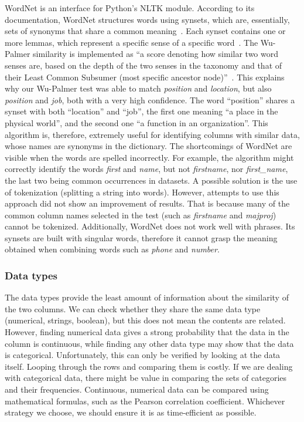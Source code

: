 \bigbreak

WordNet is an interface for Python's NLTK module.
According to its documentation, WordNet structures words using synsets, which are, essentially, sets of synonyms that
share a common meaning~\cite{wordnet}.
Each synset contains one or more lemmas, which represent a specific sense of a specific word~\cite{wordnet}.
The Wu-Palmer similarity is implemented as ``a score denoting how similar two word senses are, based on the depth of the
two senses in the taxonomy and that of their Least Common Subsumer (most specific ancestor node)''~\cite{wordnet}.
This explains why our Wu-Palmer test was able to match \textit{position} and \textit{location}, but also \textit{position}
and \textit{job}, both with a very high confidence.
The word ``position'' shares a synset with both ``location'' and ``job'', the first one meaning ``a place in the physical world'',
and the second one ``a function in an organization''.
This algorithm is, therefore, extremely useful for identifying columns with similar data, whose names are synonyms in the
dictionary.
The shortcomings of WordNet are visible when the words are spelled incorrectly.
For example, the algorithm might correctly identify the words \textit{first} and \textit{name}, but not \textit{firstname},
nor \textit{first\_name}, the last two being common occurrences in datasets.
A possible solution is the use of tokenization (splitting a string into words).
However, attempts to use this approach did not show an improvement of results.
That is because many of the common column names selected in the test (such as \textit{firstname} and \textit{majproj}) cannot
be tokenized.
Additionally, WordNet does not work well with phrases.
Its synsets are built with singular words, therefore it cannot grasp the meaning obtained when combining words such as
\textit{phone} and \textit{number}.

\subsubsection{Data types}
The data types provide the least amount of information about the similarity of the two columns.
We can check whether they share the same data type (numerical, strings, boolean), but this does not mean the contents
are related.
However, finding numerical data gives a strong probability that the data in the column is continuous, while finding any other
data type may show that the data is categorical.
Unfortunately, this can only be verified by looking at the data itself.
Looping through the rows and comparing them is costly.
If we are dealing with categorical data, there might be value in comparing the sets of categories and their frequencies.
Continuous, numerical data can be compared using mathematical formulas, such as the Pearson correlation coefficient.
Whichever strategy we choose, we should ensure it is as time-efficient as possible.

